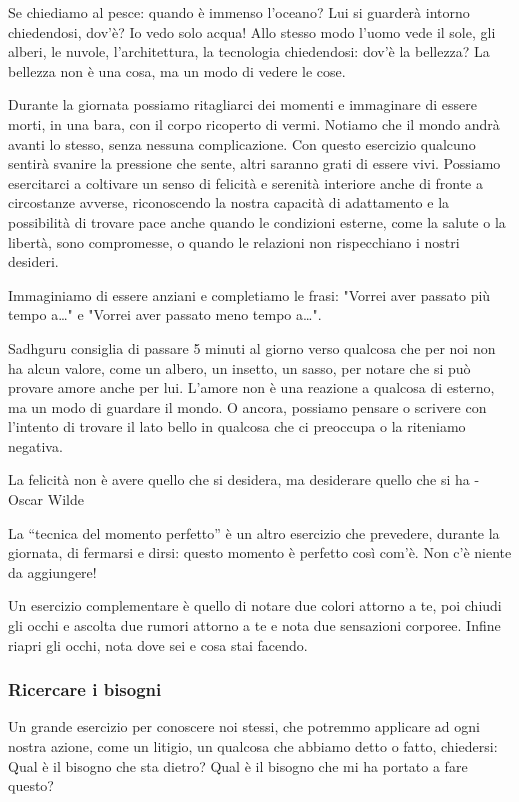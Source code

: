 \documentclass[12pt]{book} %
\begin{document}
Se chiediamo al pesce: quando è immenso l'oceano? Lui si guarderà intorno chiedendosi, dov'è? Io
vedo solo acqua! Allo stesso modo l'uomo vede il sole, gli alberi, le nuvole,
l'architettura, la tecnologia chiedendosi: dov'è la bellezza? La bellezza non è una cosa, ma un
modo di vedere le cose.

Durante la giornata possiamo ritagliarci dei momenti e immaginare di essere morti, in una bara, con il corpo ricoperto
di vermi. Notiamo che il mondo andrà avanti lo stesso, senza nessuna complicazione. Con questo esercizio qualcuno
sentirà svanire la pressione che sente, altri saranno grati di essere vivi.
Possiamo esercitarci a coltivare un senso di felicità e serenità interiore anche di fronte a circostanze avverse, riconoscendo la nostra capacità di adattamento e la possibilità di trovare pace anche quando le condizioni esterne, come la salute o la libertà, sono compromesse, o quando le relazioni non rispecchiano i nostri desideri.

Immaginiamo di essere anziani e completiamo le frasi: "Vorrei aver passato più tempo a…" e "Vorrei aver passato meno tempo a…". 

Sadhguru consiglia di passare 5 minuti al giorno verso qualcosa che per noi non ha alcun valore, come un albero, un
insetto, un sasso, per notare che si può provare amore anche per lui. L'amore non è una reazione a qualcosa di esterno,
ma un modo di guardare il mondo. O ancora, possiamo pensare o scrivere con l'intento di trovare il
lato bello in qualcosa che ci preoccupa o la riteniamo negativa.

La felicità non è avere quello che si desidera, ma desiderare quello che si ha - Oscar Wilde 

La “tecnica del momento perfetto” è un altro esercizio che prevedere, durante la giornata, di fermarsi e dirsi: questo
momento è perfetto così com'è. Non c'è niente da aggiungere!

Un esercizio complementare è quello di notare due colori attorno a te, poi chiudi gli occhi e ascolta due rumori attorno a te e nota due sensazioni corporee. Infine riapri gli occhi, nota dove sei e cosa stai facendo.

\subsubsection{Ricercare i bisogni}
Un grande esercizio per conoscere noi stessi, che potremmo applicare ad ogni nostra azione, come un litigio, un qualcosa che abbiamo detto o fatto, chiedersi: Qual è il bisogno che sta dietro? Qual è il  bisogno che mi ha portato a fare questo?
\end{document}
